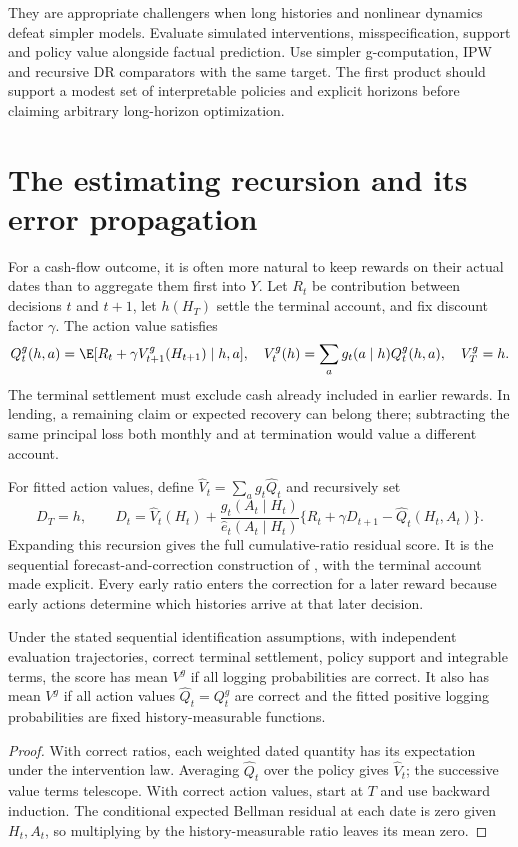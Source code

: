 They are appropriate challengers when long histories and nonlinear dynamics
defeat simpler models. Evaluate simulated interventions, misspecification,
support and policy value alongside factual prediction. Use simpler
g-computation, IPW and recursive DR comparators with the same target.
The first product should support a modest set of interpretable policies and
explicit horizons before claiming arbitrary long-horizon optimization.

\section{The estimating recursion and its error propagation}
For a cash-flow outcome, it is often more natural to keep rewards on their
actual dates than to aggregate them first into $Y$. Let $R_t$ be contribution
between decisions $t$ and $t+1$, let $h(H_T)$ settle the terminal account,
and fix discount factor $\gamma$. The action value satisfies
\[
 Q_t^g(h,a)=\E[R_t+\gamma V_{t+1}^g(H_{t+1})\mid h,a],
 \quad V_t^g(h)=\sum_a g_t(a\mid h)Q_t^g(h,a),
 \quad V_T^g=h.
\]
The terminal settlement must exclude cash already included in earlier
rewards. In lending, a remaining claim or expected recovery can belong
there; subtracting the same principal loss both monthly and at termination
would value a different account.

For fitted action values, define $\widehat V_t=\sum_a g_t\widehat Q_t$
and recursively set
\begin{equation}
 D_T=h,\qquad
 D_t=\widehat V_t(H_t)+\frac{g_t(A_t\mid H_t)}{\widehat e_t(A_t\mid H_t)}
       \{R_t+\gamma D_{t+1}-\widehat Q_t(H_t,A_t)\}.
 \label{eq:backward-dr}
\end{equation}
Expanding this recursion gives the full cumulative-ratio residual score.
It is the sequential forecast-and-correction construction of
\citet[Section 4.1]{jiang2016}, with the terminal account made explicit.
Every early ratio enters the correction for a later reward because early
actions determine which histories arrive at that later decision.

\begin{proposition}
Under the stated sequential identification assumptions, with independent
evaluation trajectories, correct terminal settlement,
policy support and integrable terms, the score has mean $V^g$ if all
logging probabilities are correct. It also has mean $V^g$ if all action
values $\widehat Q_t=Q_t^g$ are correct and the fitted positive logging
probabilities are fixed history-measurable functions.
\end{proposition}
\begin{proof}
With correct ratios, each weighted dated quantity has its expectation under
the intervention law. Averaging $\widehat Q_t$ over the policy gives
$\widehat V_t$; the successive value terms telescope. With correct action
values, start at $T$ and use backward induction. The conditional expected
Bellman residual at each date is zero given $H_t,A_t$, so multiplying by
the history-measurable ratio leaves its mean zero.
\end{proof}

